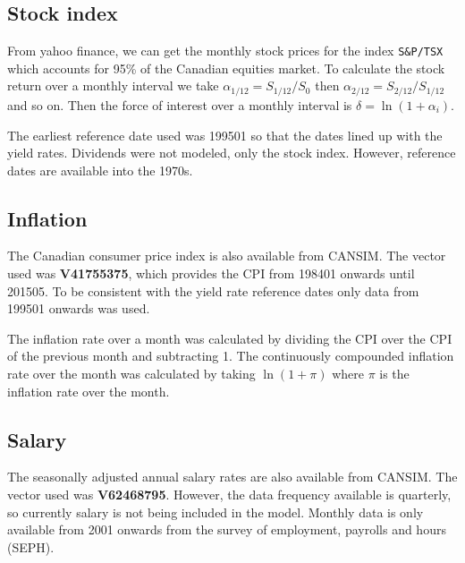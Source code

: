 \documentclass[12pt]{article}
\begin{document}
\subsection{Stock index}
From yahoo finance, we can get the monthly stock prices for the index
\texttt{S\&P/TSX} which accounts for 95\% of the Canadian equities market. To
calculate the stock return over a monthly interval we take $\alpha_{1/12} = S_{1/12} / S_{0}$
then $\alpha_{2/12} = S_{2/12} / S_{1/12}$ and so on. Then the force of interest
over a monthly interval is $\delta = \ln(1+\alpha_i)$. 

\medskip
The earliest reference date used was 199501 so that the dates lined up with the
yield rates. Dividends were not modeled, only the stock index. However,
reference dates are available into the 1970s.

\subsection{Inflation}
The Canadian consumer price index is also available from CANSIM. The vector used
was \textbf{V41755375}, which provides the CPI from 198401 onwards until
201505. To be consistent with the yield rate reference dates only data from
199501 onwards was used.

The inflation rate over a month was calculated by dividing the CPI over the CPI
of the previous month and subtracting 1. The continuously compounded inflation
rate over the month was calculated by taking $\ln(1+\pi)$ where $\pi$ is the
inflation rate over the month.

\subsection{Salary}
The seasonally adjusted annual salary rates are also available from CANSIM. The
	vector used was \textbf{V62468795}. However, the data frequency available is
	quarterly, so currently salary is not being included in the model. Monthly data
    is only available from 2001 onwards from the survey of employment, payrolls and hours (SEPH).
\end{document}

